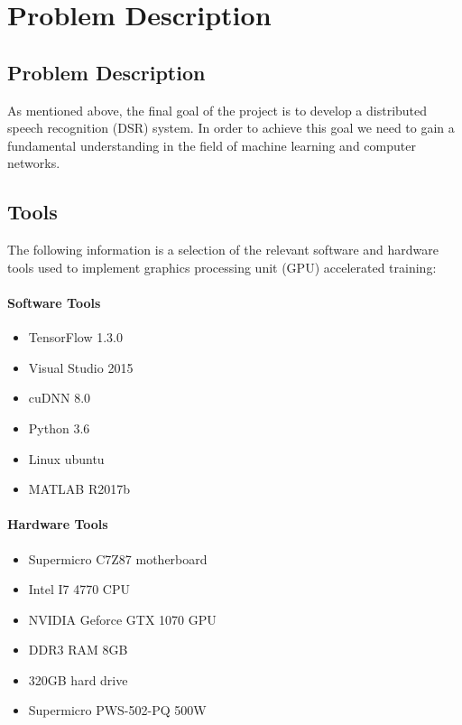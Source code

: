 \chapter{Problem Description}\label{ch:problem_description}
\section{Problem Description}
As mentioned above, the final goal of the project is to develop a distributed speech recognition (DSR) system.
In order to achieve this goal we need to gain a fundamental understanding in the field of machine learning and computer networks.\\

\section{Tools}
The following information is a selection of the relevant software and hardware tools used to implement graphics processing unit (GPU) accelerated training:

\subsubsection{Software Tools}
\begin{itemize}
    \item TensorFlow 1.3.0
    \item Visual Studio 2015
    \item cuDNN 8.0
    \item Python 3.6
    \item Linux ubuntu
    \item MATLAB  R2017b
\end{itemize}

\subsubsection{Hardware Tools}
\begin{itemize}
    \item Supermicro C7Z87 motherboard
    \item Intel I7 4770 CPU
    \item NVIDIA Geforce GTX 1070 GPU
    \item DDR3 RAM 8GB
    \item 320GB hard drive
    \item Supermicro PWS-502-PQ 500W
\end{itemize}

